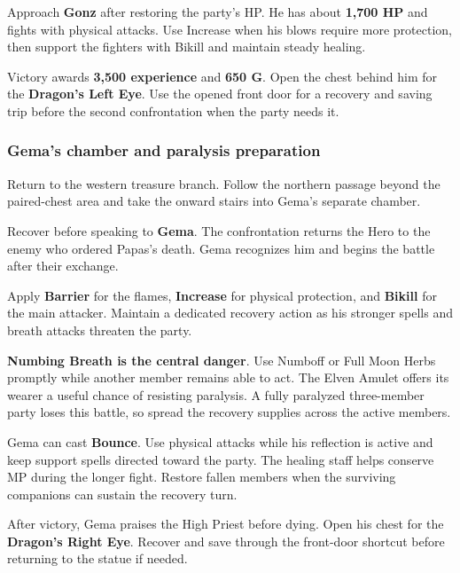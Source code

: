 Approach \textbf{Gonz} after restoring the party's HP.
He has about \textbf{1,700 HP} and fights with physical attacks.
Use Increase when his blows require more protection, then
support the fighters with Bikill and maintain steady healing.

Victory awards \textbf{3,500 experience} and \textbf{650 G}.
Open the chest behind him for the \textbf{Dragon's Left Eye}.
Use the opened front door for a recovery and saving trip
before the second confrontation when the party needs it.

\subsubsection*{Gema's chamber and paralysis preparation}

Return to the western treasure branch. Follow the northern
passage beyond the paired-chest area and take the onward
stairs into Gema's separate chamber.

Recover before speaking to \textbf{Gema}. The confrontation
returns the Hero to the enemy who ordered Papas's death.
Gema recognizes him and begins the battle after their exchange.

Apply \textbf{Barrier} for the flames, \textbf{Increase}
for physical protection, and \textbf{Bikill} for the main
attacker. Maintain a dedicated recovery action as his stronger
spells and breath attacks threaten the party.

\textbf{Numbing Breath is the central danger}. Use Numboff
or Full Moon Herbs promptly while another member remains
able to act. The Elven Amulet offers its wearer a useful
chance of resisting paralysis. A fully paralyzed three-member
party loses this battle, so spread the recovery supplies
across the active members.

Gema can cast \textbf{Bounce}. Use physical attacks while
his reflection is active and keep support spells directed
toward the party. The healing staff helps conserve MP during
the longer fight. Restore fallen members when the surviving
companions can sustain the recovery turn.

After victory, Gema praises the High Priest before dying.
Open his chest for the \textbf{Dragon's Right Eye}.
Recover and save through the front-door shortcut before
returning to the statue if needed.


